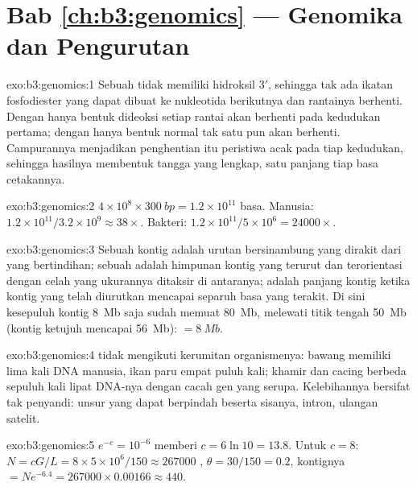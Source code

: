\section*{Bab \ref{ch:b3:genomics} --- Genomika dan Pengurutan}

\begin{solution}{exo:b3:genomics:1}
Sebuah  tidak memiliki hidroksil 3$'$, sehingga tak ada
ikatan fosfodiester yang dapat dibuat ke nukleotida berikutnya dan rantainya
berhenti. Dengan hanya bentuk dideoksi setiap rantai akan berhenti pada
kedudukan pertama; dengan hanya bentuk normal tak satu pun akan berhenti.
Campurannya menjadikan penghentian itu peristiwa acak pada tiap kedudukan,
sehingga hasilnya membentuk tangga yang lengkap, satu panjang tiap basa
cetakannya.
\end{solution}

\begin{solution}{exo:b3:genomics:2}
$4\times 10^{8}\times \qty{300}{bp} = 1.2\times 10^{11}$ basa. Manusia:
$1.2\times 10^{11}/3.2\times 10^{9} \approx 38\times$. Bakteri:
$1.2\times 10^{11}/5\times 10^{6} = \num{24000}\times$.
\end{solution}

\begin{solution}{exo:b3:genomics:3}
Sebuah kontig adalah urutan bersinambung yang dirakit dari  yang
bertindihan; sebuah  adalah himpunan kontig yang terurut dan
terorientasi dengan celah yang ukurannya ditaksir di antaranya;  adalah
panjang kontig ketika kontig yang telah diurutkan mencapai separuh basa yang
terakit. Di sini kesepuluh kontig \qty{8}{Mb} saja sudah memuat \qty{80}{Mb},
melewati titik tengah \qty{50}{Mb} (kontig ketujuh mencapai \qty{56}{Mb}):
 $= \qty{8}{Mb}$.
\end{solution}

\begin{solution}{exo:b3:genomics:4}
 tidak mengikuti kerumitan organismenya: bawang memiliki lima
kali DNA manusia, ikan paru empat puluh kali; khamir dan cacing berbeda
sepuluh kali lipat DNA-nya dengan cacah gen yang serupa. Kelebihannya bersifat
tak penyandi: unsur yang dapat berpindah beserta sisanya, intron, ulangan
satelit.
\end{solution}

\begin{solution}{exo:b3:genomics:5}
$e^{-c} = 10^{-6}$ memberi $c = 6\ln 10 = 13.8$. Untuk $c = 8$: $N =
cG/L = 8\times 5\times 10^{6}/150 \approx \num{267000}$ , $\theta
= 30/150 = 0.2$, kontignya $= N e^{-6.4} = \num{267000}\times 0.00166
\approx 440$.
\end{solution}

